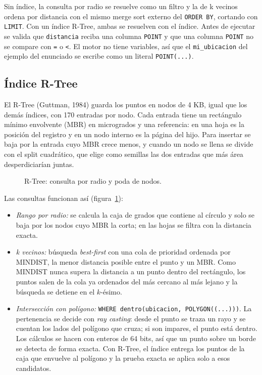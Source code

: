 \documentclass[11pt,a4paper]{article}
\begin{document}
Sin índice, la consulta por radio se resuelve como un filtro y la de k vecinos ordena por distancia con el mismo merge sort externo del \texttt{ORDER BY}, cortando con \texttt{LIMIT}. Con un índice R-Tree, ambas se resuelven con el índice. Antes de ejecutar se valida que \texttt{distancia} reciba una columna \texttt{POINT} y que una columna \texttt{POINT} no se compare con \texttt{=} o \texttt{<}. El motor no tiene variables, así que el \texttt{mi\_ubicacion} del ejemplo del enunciado se escribe como un literal \texttt{POINT(...)}.

\subsection{Índice R-Tree}

El R-Tree (Guttman, 1984) guarda los puntos en nodos de 4 KB, igual que los demás índices, con 170 entradas por nodo. Cada entrada tiene un rectángulo mínimo envolvente (MBR) en microgrados y una referencia: en una hoja es la posición del registro y en un nodo interno es la página del hijo. Para insertar se baja por la entrada cuyo MBR crece menos, y cuando un nodo se llena se divide con el split cuadrático, que elige como semillas las dos entradas que más área desperdiciarían juntas.

\begin{figure}[!htbp]
\centering

\caption{R-Tree: consulta por radio y poda de nodos.}
\label{fig:rtree}
\end{figure}

Las consultas funcionan así (figura~\ref{fig:rtree}):

\begin{itemize}
  \item \emph{Rango por radio:} se calcula la caja de grados que contiene al círculo y solo se baja por los nodos cuyo MBR la corta; en las hojas se filtra con la distancia exacta.
  \item \emph{k vecinos:} búsqueda \emph{best-first} con una cola de prioridad ordenada por MINDIST, la menor distancia posible entre el punto y un MBR. Como MINDIST nunca supera la distancia a un punto dentro del rectángulo, los puntos salen de la cola ya ordenados del más cercano al más lejano y la búsqueda se detiene en el $k$-ésimo.
  \item \emph{Intersección con polígono:} \texttt{WHERE dentro(ubicacion, POLYGON((...)))}. La pertenencia se decide con \emph{ray casting}: desde el punto se traza un rayo y se cuentan los lados del polígono que cruza; si son impares, el punto está dentro. Los cálculos se hacen con enteros de 64 bits, así que un punto sobre un borde se detecta de forma exacta. Con R-Tree, el índice entrega los puntos de la caja que envuelve al polígono y la prueba exacta se aplica solo a esos candidatos.
\end{itemize}
\end{document}

